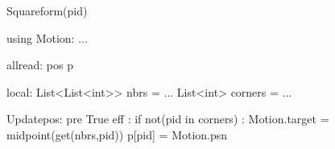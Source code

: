 Squareform(pid)

using Motion:
...

allread:
  pos p$\label{shapeformp}$

local:
  List<List<int>> nbrs = ...
  List<int> corners = ...
  

Updatepos:
  pre True
  eff :
     if not(pid in corners) :
        Motion.target = midpoint(get(nbrs,pid))
    p[pid] = Motion.psn

    